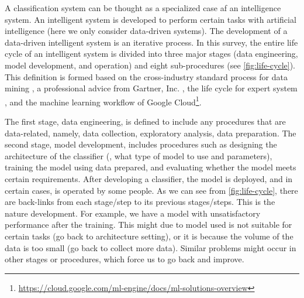 A classification system can be thought as a specialized case af an intelligence system. An intelligent system is developed to perform certain tasks with artificial intelligence (here we only consider data-driven systems). 
The development of a data-driven intelligent system is an iterative process. In this survey, the entire life cycle of an intelligent system is divided into three major stages (data engineering, model development, and operation) and eight sub-procedures (see \autoref{fig:life-cycle}). This definition is formed based on the cross-industry standard process for data mining \cite{wirth2000crisp}, a professional advice from Gartner, Inc. \cite{carlton2017ml}, the life cycle for expert system \cite{lasalle1990expert-system}, and the machine learning workflow of Google Cloud\footnote{\url{https://cloud.google.com/ml-engine/docs/ml-solutions-overview}}.

The first stage, data engineering, is defined to include any procedures that are data-related, namely, data collection, exploratory analysis, data preparation. The second stage, model development, includes procedures such as designing the architecture of the classifier (\eg, what type of model to use and parameters), training the model using data prepared, and evaluating whether the model meets certain requirements. After developing a classifier, the model is deployed, and in certain cases, is operated by some people. As we can see from \autoref{fig:life-cycle}, there are back-links from each stage/step to its previous stages/steps. This is the nature development. For example, we have a model with unsatisfactory performance after the training. This might due to model used is not suitable for certain tasks (go back to architecture setting), or it is because the volume of the data is too small (go back to collect more data). Similar problems might occur in other stages or procedures, which force us to go back and improve. 

